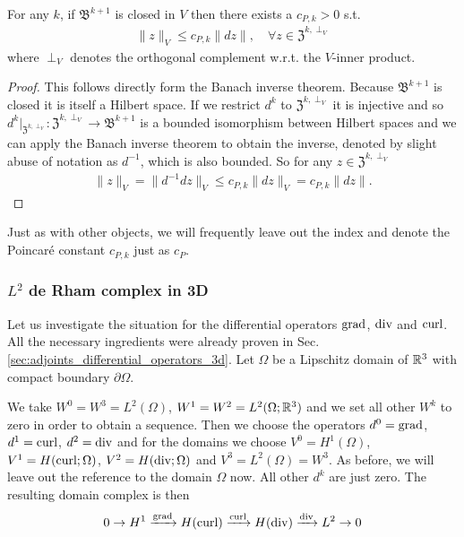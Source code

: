 \documentclass[../master_thesis.tex]{subfiles}
\begin{document}
\begin{theorem} \label{thm:poincare_inequality}
    For any $k$, if $\mathfrak{B}^{k+1}$ is closed in $V$ then there exists a 
    $c_{P,k}>0$ s.t. 
    \begin{align*}
        \lVert z \rVert _V \leq c_{P,k} \lVert dz \rVert, \quad \forall z \in \mathfrak{Z}^{k,\perp_V}
    \end{align*}
    where $\perp_V$ denotes the orthogonal complement w.r.t. the $V$-inner product.
\end{theorem}
\begin{proof}
    This follows directly form the Banach inverse theorem. Because $\mathfrak{B}^{k+1}$ is closed
    it is itself a Hilbert space. If we restrict $d^k$ to $\mathfrak{Z}^{k,\perp_V}$ it 
    is injective and so $d^k|_{\mathfrak{Z}^{k,\perp_V}}:\mathfrak{Z}^{k,\perp_V} 
    \rightarrow \mathfrak{B}^{k+1}$ is a bounded isomorphism between 
    Hilbert spaces and we can apply the Banach inverse theorem to obtain the inverse, 
    denoted by slight abuse of notation as $d^{-1}$, which is also bounded. So 
    for any $z \in \mathfrak{Z}^{k,\perp_V}$
    \begin{align*}
        \lVert z \rVert _V = \lVert d^{-1} dz \rVert _V  \leq c_{P,k} \lVert dz \rVert _V 
        = c_{P,k} \lVert dz \rVert.
    \end{align*}
\end{proof}
Just as with other objects, we will frequently leave out the index and denote the 
Poincaré constant $c_{P,k}$ just as $c_P$.

\subsubsection{$L^2$ de Rham complex in 3D} \label{sec:l2_de_rham_complex_in_3d}
Let us investigate the situation for the differential operators 
$\operatorname{grad}$, $\operatorname{div}$ and $\operatorname{curl}$. All the necessary ingredients were already 
proven in Sec.\,\ref{sec:adjoints_differential_operators_3d}. 
Let $\Omega$ be a Lipschitz domain of 
$\mathbb{R}^3$ with compact boundary $\partial \Omega$. %

We take $W^0 = W^3 = L^2(\Omega)$, $W^1 = W^2 = L^2(\Omega;\mathbb{R}^3)$ 
and we set all other $W^k$ to zero in order to obtain a sequence.
Then we choose the operators $d^0 = \operatorname{grad}$, $d^1 = \operatorname{curl}$, $d^2 = \operatorname{div}$ and
for the domains we choose $V^0 = H^1(\Omega)$, $V^1 = H(\operatorname{curl};\Omega)$, 
$V^2 = H(\operatorname{div};\Omega)$ and $V^3 = L^2(\Omega) = W^3$. 
As before, we will leave out the reference to the domain $\Omega$ now.
All other 
$d^k$ are just zero. The resulting domain complex is then
\begin{align}
    0 \rightarrow H^1 \xrightarrow{\grad} H(\curl)
        \xrightarrow{\curl} H(\diver) \xrightarrow{\diver} L^2 \rightarrow 0
    \label{eq:primal_de_rham_complex_3d}
\end{align}
\end{document}
